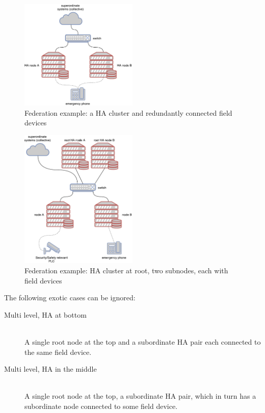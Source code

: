 \begin{figure}[]
	\center
	\includegraphics[width=0.5\textwidth]{img/topo_sl_ha.pdf}
	\caption{Federation example: a HA cluster and redundantly connected field devices}
	\label{fig:topo:sl:ha}
\end{figure}
\begin{figure}[]
	\center
	\includegraphics[width=0.5\textwidth]{img/topo_ml_ha.pdf}
	\caption{Federation example: HA cluster at root, two subnodes, each with field devices}
	\label{fig:topo:ml:ha}
\end{figure}

The following exotic cases can be ignored: %

\begin{description}
	\item [ Multi level, \gls{HA} at bottom ] \hfill\\
	A single root node at the top and a subordinate HA pair each connected
	to the same field device.

	\item [ Multi level, \gls{HA} in the middle ] \hfill\\
	A single root node at the top, a subordinate HA pair, which in turn has
	a subordinate node connected to some field device.
\end{description}

